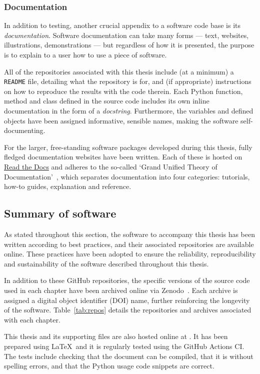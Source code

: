 \subsubsection{Documentation}

In addition to testing, another crucial appendix to a software code base is its
\emph{documentation}. Software documentation can take many forms --- text,
websites, illustrations, demonstrations --- but regardless of how it is
presented, the purpose is to explain to a user how to use a piece of software.

All of the repositories associated with this thesis include (at a minimum) a
\texttt{README} file, detailing what the repository is for, and (if
appropriate) instructions on how to reproduce the results with the code therein.
Each Python function, method and class defined in the source code includes its
own inline documentation in the form of a \emph{docstring}. Furthermore, the
variables and defined objects have been assigned informative, sensible names,
making the software self-documenting.

For the larger, free-standing software packages developed during this thesis,
fully fledged documentation websites have been written. Each of these is hosted
on \href{https://readthedocs.org/}{Read the Docs} and adheres to the so-called
`Grand Unified Theory of Documentation'~\cite{documentation}, which separates
documentation into four categories: tutorials, how-to guides, explanation and
reference.

\subsection{Summary of software}

As stated throughout this section, the software to accompany this thesis has
been written according to best practices, and their associated repositories are
available online. These practices have been adopted to ensure the reliability,
reproducibility and sustainability of the software described throughout this
thesis.

In addition to these GitHub repositories, the specific versions of the source
code used in each chapter have been archived online via Zenodo~\cite{zenodo}.
Each archive is assigned a digital object identifier (DOI) name, further
reinforcing the longevity of the software. Table~\ref{tab:repos} details the
repositories and archives associated with each chapter.

\begin{table}[tbhp]
    \centering%
    \resizebox{\textwidth}{!}{%
    }\caption{%
        The repositories and archives associated with each chapter
    }\label{tab:repos}
\end{table}

This thesis and its supporting files are also hosted online at
. It has been prepared using \LaTeX\ and it is
regularly tested using the GitHub Actions CI. The tests include checking that
the document can be compiled, that it is without spelling errors, and that the
Python usage code snippets are correct.
